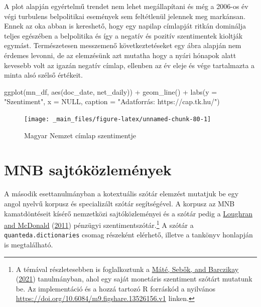 \documentclass[
]{book}
\newenvironment{Shaded}{\begin{snugshade}}{\end{snugshade}}
\newcommand{\AttributeTok}[1]{\textcolor[rgb]{0.77,0.63,0.00}{#1}}
\newcommand{\ConstantTok}[1]{\textcolor[rgb]{0.00,0.00,0.00}{#1}}
\newcommand{\FunctionTok}[1]{\textcolor[rgb]{0.00,0.00,0.00}{#1}}
\newcommand{\NormalTok}[1]{#1}
\newcommand{\SpecialCharTok}[1]{\textcolor[rgb]{0.00,0.00,0.00}{#1}}
\newcommand{\StringTok}[1]{\textcolor[rgb]{0.31,0.60,0.02}{#1}}
\begin{document}
A plot alapján egyértelmű trendet nem lehet megállapítani és még a
2006-os év végi turbulens belpolitikai események sem feltétlenül
jelennek meg markánsan. Ennek az oka abban is kereshető, hogy egy
napilap címlapját ritkán dominálja teljes egészében a belpolitika és így
a negatív és pozitív szentimentek kioltják egymást. Természetesen
messzemenő következtetéseket egy ábra alapján nem érdemes levonni, de az
elemzésünk azt mutatha hogy a nyári hónapok alatt kevesebb volt az
igazán negatív címlap, ellenben az év eleje és vége tartalmazta a minta
alsó szélső értékeit.

\begin{Shaded}
\begin{Highlighting}[]
\FunctionTok{ggplot}\NormalTok{(mn\_df, }\FunctionTok{aes}\NormalTok{(doc\_date, net\_daily)) }\SpecialCharTok{+} \FunctionTok{geom\_line}\NormalTok{() }\SpecialCharTok{+} \FunctionTok{labs}\NormalTok{(}\AttributeTok{y =} \StringTok{"Szentiment"}\NormalTok{, }\AttributeTok{x =} \ConstantTok{NULL}\NormalTok{, }
    \AttributeTok{caption =} \StringTok{"Adatforrás: https://cap.tk.hu/"}\NormalTok{)}
\end{Highlighting}
\end{Shaded}

\begin{figure}

{\centering \texttt{[image: \_main\_files/figure-latex/unnamed-chunk-80-1]} 

}

\caption{Magyar Nemzet címlap szentimentje}\label{fig:unnamed-chunk-80}
\end{figure}

\hypertarget{mnb-sajtuxf3kuxf6zlemuxe9nyek}{%
\section{MNB sajtóközlemények}\label{mnb-sajtuxf3kuxf6zlemuxe9nyek}}

A második esettanulmányban a kotextuális szótár elemzést mutatjuk be egy
angol nyelvű korpusz és specializált szótár segítségével. A korpusz az
MNB kamatdöntéseit kísérő nemzetközi sajtóközleményei és a szótár pedig
a \protect\hyperlink{ref-loughran2011}{Loughran and McDonald}
(\protect\hyperlink{ref-loughran2011}{2011}) pénzügyi
szentimentszótár.\footnote{A témával részletesebben is foglalkoztunk a
  \protect\hyperlink{ref-muxe1tuxe92021}{Máté, Sebők, and Barczikay}
  (\protect\hyperlink{ref-muxe1tuxe92021}{2021}) tanulmányban, ahol egy
  saját monetáris szentiment szótárt mutatunk be. Az implementáció és a
  hozzá tartozó R forráskód a nyilvános
  \url{https://doi.org/10.6084/m9.figshare.13526156.v1} linken.} A
szótár a \texttt{quanteda.dictionaries} csomag részeként elérhető,
illetve a tankönyv honlapján is megtalálható.
\end{document}
